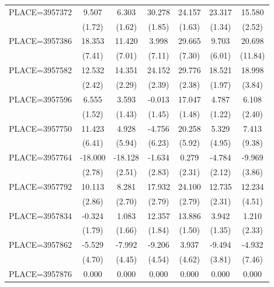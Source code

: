 {\begin{tabular}{l*{6}{c}}
PLACE=3957372       &       9.507&       6.303&      30.278&      24.157&      23.317&      15.580\\
                    &      (1.72)&      (1.62)&      (1.85)&      (1.63)&      (1.34)&      (2.52)\\
PLACE=3957386       &      18.353&      11.420&       3.998&      29.665&       9.703&      20.698\\
                    &      (7.41)&      (7.01)&      (7.11)&      (7.30)&      (6.01)&     (11.84)\\
PLACE=3957582       &      12.532&      14.351&      24.152&      29.776&      18.521&      18.998\\
                    &      (2.42)&      (2.29)&      (2.39)&      (2.38)&      (1.97)&      (3.84)\\
PLACE=3957596       &       6.555&       3.593&      -0.013&      17.047&       4.787&       6.108\\
                    &      (1.52)&      (1.43)&      (1.45)&      (1.48)&      (1.22)&      (2.40)\\
PLACE=3957750       &      11.423&       4.928&      -4.756&      20.258&       5.329&       7.413\\
                    &      (6.41)&      (5.94)&      (6.23)&      (5.92)&      (4.95)&      (9.38)\\
PLACE=3957764       &     -18.000&     -18.128&      -1.634&       0.279&      -4.784&      -9.969\\
                    &      (2.78)&      (2.51)&      (2.83)&      (2.31)&      (2.12)&      (3.86)\\
PLACE=3957792       &      10.113&       8.281&      17.932&      24.100&      12.735&      12.234\\
                    &      (2.86)&      (2.70)&      (2.79)&      (2.79)&      (2.31)&      (4.51)\\
PLACE=3957834       &      -0.324&       1.083&      12.357&      13.886&       3.942&       1.210\\
                    &      (1.79)&      (1.66)&      (1.84)&      (1.50)&      (1.35)&      (2.33)\\
PLACE=3957862       &      -5.529&      -7.992&      -9.206&       3.937&      -9.494&      -4.932\\
                    &      (4.70)&      (4.45)&      (4.54)&      (4.62)&      (3.81)&      (7.46)\\
PLACE=3957876       &       0.000&       0.000&       0.000&       0.000&       0.000&       0.000\\

\end{tabular}}
